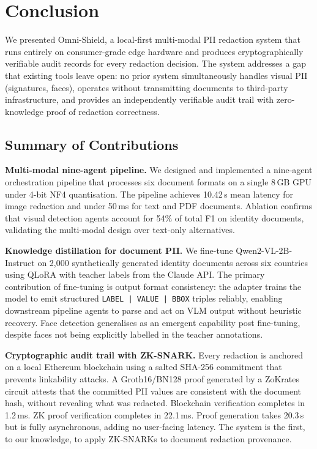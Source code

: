 \section{Conclusion}
\label{sec:conclusion}

We presented Omni-Shield, a local-first multi-modal
PII redaction system that runs entirely on consumer-grade
edge hardware and produces cryptographically verifiable
audit records for every redaction decision.
The system addresses a gap that existing tools leave
open: no prior system simultaneously handles visual
PII (signatures, faces), operates without transmitting
documents to third-party infrastructure, and provides
an independently verifiable audit trail with
zero-knowledge proof of redaction correctness.

\subsection*{Summary of Contributions}

\textbf{Multi-modal nine-agent pipeline.}
We designed and implemented a nine-agent orchestration
pipeline that processes six document formats on a
single 8\,GB GPU under 4-bit NF4 quantisation.
The pipeline achieves 10.42\,s mean latency for image
redaction and under 50\,ms for text and PDF documents.
Ablation confirms that visual detection agents
account for 54\% of total F1 on identity documents,
validating the multi-modal design over text-only
alternatives.

\textbf{Knowledge distillation for document PII.}
We fine-tune Qwen2-VL-2B-Instruct on 2,000
synthetically generated identity documents across six
countries using QLoRA with teacher labels from the
Claude API.
The primary contribution of fine-tuning is output
format consistency: the adapter trains the model to
emit structured \texttt{LABEL\,|\,VALUE\,|\,BBOX}
triples reliably, enabling downstream pipeline agents
to parse and act on VLM output without heuristic
recovery.
Face detection generalises as an emergent capability
post fine-tuning, despite faces not being explicitly
labelled in the teacher annotations.

\textbf{Cryptographic audit trail with ZK-SNARK.}
Every redaction is anchored on a local Ethereum
blockchain using a salted SHA-256 commitment that
prevents linkability attacks.
A Groth16/BN128 proof generated by a ZoKrates circuit
attests that the committed PII values are consistent
with the document hash, without revealing what was
redacted.
Blockchain verification completes in 1.2\,ms.
ZK proof verification completes in 22.1\,ms.
Proof generation takes 20.3\,s but is fully
asynchronous, adding no user-facing latency.
The system is the first, to our knowledge, to apply
ZK-SNARKs to document redaction provenance.

